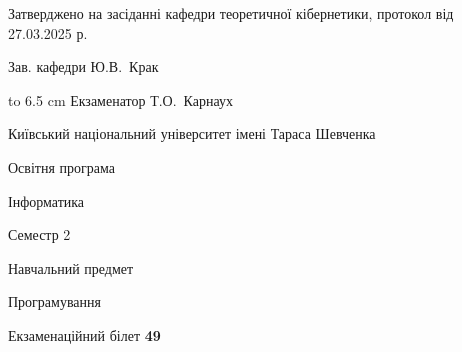 \documentclass[12pt, ukrainian]{article}
\begin{document}
{\smallskip\smallskip \begin {scriptsize} Затверджено на засіданні кафедри теоретичної кібернетики, протокол   від   27.03.2025 р.\par\smallskip\smallskip\smallskip\smallskip
{\parbox {6.5 cm} {Зав. кафедри \dotfill Ю.В.~Крак}}\hspace {0.7cm} {\hbox to 6.5 cm { Екзаменатор \dotfill Т.О.~Карнаух}} \end{scriptsize}}
\newpage
{{\begin {scriptsize}\par
{ \center  Київський національний університет імені Тараса Шевченка \par}
{\parbox {5 cm}{Освітня програма \hfill}{\parbox {7 cm}{Інформатика\hfill}}\parbox {6 cm}{\hfill Семестр 2}}\par
{\parbox {5 cm} {Навчальний предмет \hfill}\parbox {7 cm}{Програмування \hfill}\parbox {6cm}{\hfill}\par}\vspace{-15pt} \end{scriptsize}}{\center Екзаменаційний білет \No \textbf { 49 }\par}}
\end{document}
